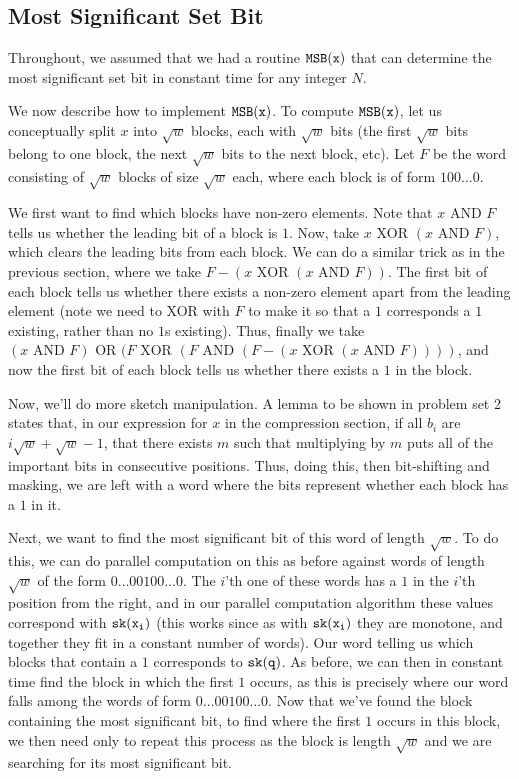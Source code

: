 \documentclass[11pt]{article}
\newcommand{\sk}[1]{{\tt{sk}(#1)}}
\newcommand{\MSB}[1]{{\tt{MSB}(#1)}}
\begin{document}
\subsection{Most Significant Set Bit}

Throughout, we assumed that we had a routine
$\MSB{x}$ that can determine the most significant set bit in
constant time for any integer $N$.

We now describe how to implement $\MSB{x}$. To compute $\MSB{x}$, let us conceptually split $x$ into $\sqrt{w}$ blocks, each with $\sqrt{w}$ bits (the first $\sqrt{w}$ bits belong to one block, the next $\sqrt{w}$ bits to the next block, etc). Let $F$ be the word consisting of $\sqrt{w}$ blocks of size $\sqrt{w}$ each, where each block is of form $100\ldots 0$.

We first want to find which blocks have non-zero elements. Note that $x\text{ AND }F$ tells us whether the leading bit of a block is $1$. Now, take $x\text{ XOR }(x\text{ AND } F)$, which clears the leading bits from each block. We can do a similar trick as in the previous section, where we take $F - (x\text{ XOR }(x\text{ AND } F))$. The first bit of each block tells us whether there exists a non-zero element apart from the leading element (note we need to XOR with $F$ to make it so that a $1$ corresponds a $1$ existing, rather than no $1$s existing). Thus, finally we take $(x\text{ AND } F)\text{ OR }(F\text{ XOR } (F\text{ AND }(F - (x\text{ XOR }(x\text{ AND } F))))$, and now the first bit of each block tells us whether there exists a $1$ in the block.

Now, we'll do more sketch manipulation. A lemma to be shown in problem set 2 states that, in our expression for $x$ in the compression section, if all $b_i$ are $i\sqrt{w} + \sqrt{w} - 1$, that there exists $m$ such that multiplying by $m$ puts all of the important bits in consecutive positions. Thus, doing this, then bit-shifting and masking, we are left with a word where the bits represent whether each block has a $1$ in it.

Next, we want to find the most significant bit of this word of length $\sqrt{w}$. To do this, we can do parallel computation on this as before against words of length $\sqrt{w}$ of the form $0\ldots00100\ldots0$. The $i$'th one of these words has a $1$ in the $i$'th position from the right, and in our parallel computation algorithm these values correspond with $\sk{x_i}$ (this works since as with $\sk{x_i}$ they are monotone, and together they fit in a constant number of words). Our word telling us which blocks that contain a $1$ corresponds to $\sk{q}$. As before, we can then in constant time find the block in which the first $1$ occurs, as this is precisely where our word falls among the words of form $0\ldots00100\ldots0$. Now that we've found the block containing the most significant bit, to find where the first $1$ occurs in this block, we then need only to repeat this process as the block is length $\sqrt{w}$ and we are searching for its most significant bit.
\end{document}
